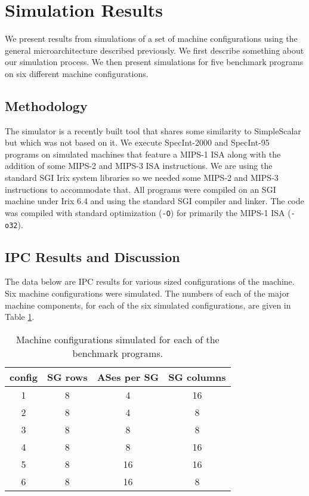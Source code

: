 \documentclass[10pt,dvips]{article}
\begin{document}
\section{Simulation Results}
%
We present results from simulations of a set of machine configurations
using the general microarchitecture described previously.
We first describe something about our simulation process.
We then present simulations for five benchmark programs
on six different machine configurations.
%
\subsection{Methodology}
%
The simulator is a recently built tool that shares some similarity
to SimpleScalar \cite{Austin97} but which was not based on it.
We execute
SpecInt-2000 and SpecInt-95 programs on simulated machines
that feature a MIPS-1 ISA along with the addition of some MIPS-2 and
MIPS-3 ISA instructions.  We are using the standard SGI Irix system
libraries so we needed some MIPS-2 and MIPS-3 instructions to accommodate
that.  All programs were compiled on an SGI machine under Irix 6.4 and
using the standard SGI compiler and linker.  The code was compiled with
standard optimization ({\tt -O}) for primarily the MIPS-1 ISA ({\tt -o32}).
%
\subsection{IPC Results and Discussion}
%
The data below are IPC results for various sized configurations of
the machine.  Six machine configurations were simulated.
The numbers of each of the major machine components, for each of the six
simulated configurations, are given in Table \ref{tab:configs}.

\begin{table}
\begin{center}
\caption{Machine configurations simulated for each of the benchmark
programs.}
\label{tab:configs}
\begin{tabular}{|c|c|c|c|}
\hline 
config&
SG rows&
ASes per SG&
SG columns\\
\hline
\hline 
1&
8&
4&
16\\
\hline 
2&
8&
4&
8\\
\hline 
3&
8&
8&
8\\
\hline 
4&
8&
8&
16\\
\hline 
5&
8&
16&
16\\
\hline 
6&
8&
16&
8\\
\hline
\end{tabular}
\end{center}
\end{table}
\end{document}
